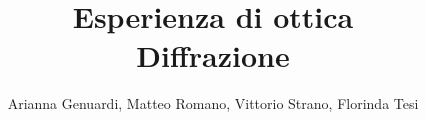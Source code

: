 \documentclass[10pt, a4paper]{article}
\title{
    \textbf{Esperienza di ottica}\\
    \medskip\Large Diffrazione
}
\author{Arianna Genuardi, Matteo Romano, Vittorio Strano, Florinda Tesi}
\date{}
\begin{document}
\maketitle

\tableofcontents









\newpage~\newpage~\newpage



\appendix


\end{document}
